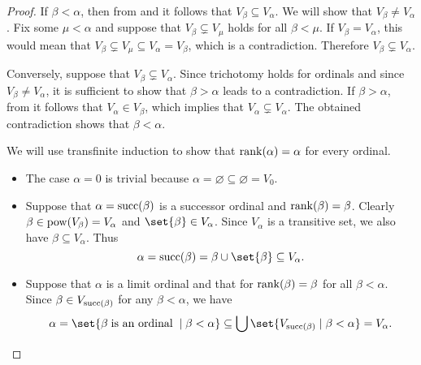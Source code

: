 \begin{proof}
   If \( \beta < \alpha \), then from  and  it follows that \( V_\beta \subseteq V_\alpha \). We will show that \( V_\beta \neq V_\alpha \). Fix some \( \mu < \alpha \) and suppose that \( V_\beta \subsetneq V_\mu \) holds for all \( \beta < \mu \). If \( V_\beta = V_\alpha \), this would mean that \( V_\beta \subsetneq V_\mu \subseteq V_\alpha = V_\beta \), which is a contradiction. Therefore \( V_\beta \subsetneq V_\alpha \).

  Conversely, suppose that \( V_\beta \subsetneq V_\alpha \). Since trichotomy holds for ordinals and since \( V_\beta \neq V_\alpha \), it is sufficient to show that \( \beta > \alpha \) leads to a contradiction. If \( \beta > \alpha \), from  it follows that \( V_\alpha \in V_\beta \), which implies that \( V_\alpha \subsetneq V_\alpha \). The obtained contradiction shows that \( \beta < \alpha \).

   We will use transfinite induction to show that \( \operatorname{rank}(\alpha) = \alpha \) for every ordinal.
  \begin{itemize}
    \item The case \( \alpha = 0 \) is trivial because \( \alpha = \varnothing \subseteq \varnothing = V_0 \).

    \item Suppose that \( \alpha = \operatorname{succ}(\beta) \) is a successor ordinal and \( \operatorname{rank}(\beta) = \beta \). Clearly \( \beta \in \operatorname{pow}(V_\beta) = V_\alpha \) and \( \set{ \beta } \in V_\alpha \). Since \( V_\alpha \) is a transitive set, we also have \( \beta \subseteq V_\alpha \). Thus
    \begin{equation*}
      \alpha = \op{succ}(\beta) = \beta \cup \set{ \beta } \subseteq V_\alpha.
    \end{equation*}

    \item Suppose that \( \alpha \) is a limit ordinal and that for \( \operatorname{rank}(\beta) = \beta \) for all \( \beta < \alpha \). Since \( \beta \in V_{\operatorname{succ}(\beta)} \) for any \( \beta < \alpha \), we have
    \begin{equation*}
      \alpha
      =
      \set{ \beta \T{is an ordinal} \given \beta < \alpha }
      \subseteq
      \bigcup\set{ V_{\op{succ}(\beta)} \given \beta < \alpha }
      =
      V_\alpha.
    \end{equation*}
  \end{itemize}
\end{proof}

